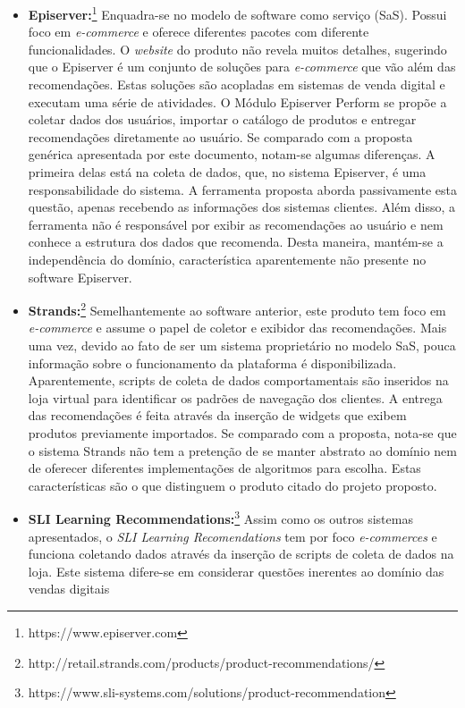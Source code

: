 \documentclass[
	12pt,				%
    oneside,			%
	a4paper,			%
	english,			%
	french,				%
	spanish,			%
	brazil,				%
	]{abntex2}
\begin{document}
\begin{itemize}
	\item \textbf{Episerver:}\footnote{https://www.episerver.com} Enquadra-se no modelo de software como serviço (SaS). Possui foco em \textit{e-commerce} e oferece diferentes pacotes com diferente funcionalidades. O 
	\textit{website} do produto não revela muitos detalhes, sugerindo que o Episerver é um conjunto de soluções para \textit{e-commerce} que vão além das recomendações. Estas soluções são acopladas em
	sistemas de venda digital e executam uma série de atividades. O Módulo Episerver Perform se propõe a coletar dados dos usuários, importar o catálogo de produtos e entregar recomendações diretamente
	ao usuário. Se comparado com a proposta genérica apresentada por este documento, notam-se algumas diferenças. A primeira delas está na coleta de dados, que, no sistema Episerver, é uma responsabilidade 
	do sistema. A ferramenta proposta aborda passivamente esta questão, apenas recebendo as informações dos sistemas clientes. Além disso, a ferramenta não é responsável por exibir as recomendações ao usuário
	e nem conhece a estrutura dos dados que recomenda. Desta maneira, mantém-se a independência do domínio, característica aparentemente não presente no software Episerver.
	\item \textbf{Strands:}\footnote{http://retail.strands.com/products/product-recommendations/} Semelhantemente ao software anterior, este produto tem foco em \textit{e-commerce} e assume o papel de coletor
	e exibidor das recomendações. Mais uma vez, devido ao fato de ser um sistema proprietário no modelo SaS, pouca informação sobre o funcionamento da plataforma é disponibilizada. Aparentemente, scripts
	de coleta de dados comportamentais são inseridos na loja virtual para identificar os padrões de navegação dos clientes. A entrega das recomendações é feita através da inserção de widgets que exibem
	produtos previamente importados. Se comparado com a proposta, nota-se que o sistema Strands não tem a pretenção de se manter abstrato ao domínio nem de oferecer diferentes implementações de algoritmos para escolha.
	Estas características são o que distinguem o produto citado do projeto proposto.
	\item \textbf{SLI Learning Recommendations:}\footnote{https://www.sli-systems.com/solutions/product-recommendation} Assim como os outros sistemas apresentados, o \textit{SLI Learning Recomendations} 
	tem por foco \textit{e-commerces} e funciona coletando dados através da inserção de scripts de coleta de dados na loja. Este sistema difere-se em considerar questões inerentes ao domínio das vendas digitais

\end{itemize}
\end{document}

